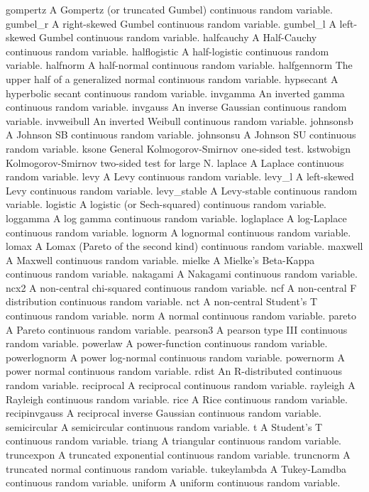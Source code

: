gompertz	A Gompertz (or truncated Gumbel) continuous random variable.
gumbel_r	A right-skewed Gumbel continuous random variable.
gumbel_l	A left-skewed Gumbel continuous random variable.
halfcauchy	A Half-Cauchy continuous random variable.
halflogistic	A half-logistic continuous random variable.
halfnorm	A half-normal continuous random variable.
halfgennorm	The upper half of a generalized normal continuous random variable.
hypsecant	A hyperbolic secant continuous random variable.
invgamma	An inverted gamma continuous random variable.
invgauss	An inverse Gaussian continuous random variable.
invweibull	An inverted Weibull continuous random variable.
johnsonsb	A Johnson SB continuous random variable.
johnsonsu	A Johnson SU continuous random variable.
ksone	General Kolmogorov-Smirnov one-sided test.
kstwobign	Kolmogorov-Smirnov two-sided test for large N.
laplace	A Laplace continuous random variable.
levy	A Levy continuous random variable.
levy_l	A left-skewed Levy continuous random variable.
levy_stable	A Levy-stable continuous random variable.
logistic	A logistic (or Sech-squared) continuous random variable.
loggamma	A log gamma continuous random variable.
loglaplace	A log-Laplace continuous random variable.
lognorm	A lognormal continuous random variable.
lomax	A Lomax (Pareto of the second kind) continuous random variable.
maxwell	A Maxwell continuous random variable.
mielke	A Mielke’s Beta-Kappa continuous random variable.
nakagami	A Nakagami continuous random variable.
ncx2	A non-central chi-squared continuous random variable.
ncf	A non-central F distribution continuous random variable.
nct	A non-central Student’s T continuous random variable.
norm	A normal continuous random variable.
pareto	A Pareto continuous random variable.
pearson3	A pearson type III continuous random variable.
powerlaw	A power-function continuous random variable.
powerlognorm	A power log-normal continuous random variable.
powernorm	A power normal continuous random variable.
rdist	An R-distributed continuous random variable.
reciprocal	A reciprocal continuous random variable.
rayleigh	A Rayleigh continuous random variable.
rice	A Rice continuous random variable.
recipinvgauss	A reciprocal inverse Gaussian continuous random variable.
semicircular	A semicircular continuous random variable.
t	A Student’s T continuous random variable.
triang	A triangular continuous random variable.
truncexpon	A truncated exponential continuous random variable.
truncnorm	A truncated normal continuous random variable.
tukeylambda	A Tukey-Lamdba continuous random variable.
uniform	A uniform continuous random variable.
